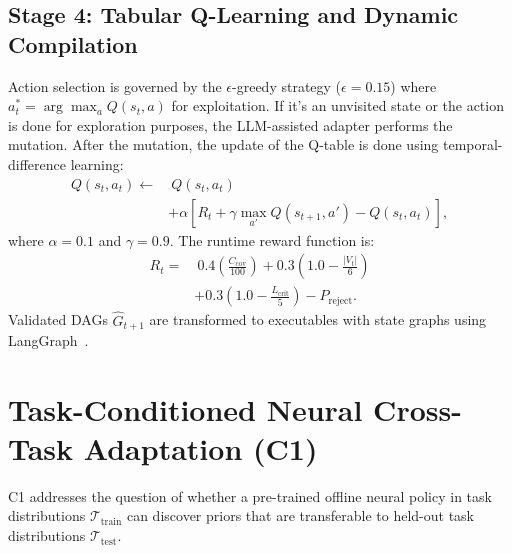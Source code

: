 ﻿\documentclass[conference]{IEEEtran}
\begin{document}
\subsection{Stage 4: Tabular Q-Learning and Dynamic Compilation}
Action selection is governed by the $\epsilon$-greedy strategy ($\epsilon=0.15$) where $a_t^* = \arg\max_a Q(s_t, a)$ for exploitation. If it's an unvisited state or the action is done for exploration purposes, the LLM-assisted adapter performs the mutation. After the mutation, the update of the Q-table is done using temporal-difference learning:
\begin{equation}
\begin{aligned}
Q(s_t, a_t) \leftarrow & \ Q(s_t, a_t) \\
& + \alpha \left[ R_t + \gamma \max_{a'} Q(s_{t+1}, a') - Q(s_t, a_t) \right],
\end{aligned}
\end{equation}
where $\alpha = 0.1$ and $\gamma = 0.9$. The runtime reward function is:
\begin{equation}
\begin{aligned}
R_t = & \ 0.4 \left(\frac{C_{\mathrm{cov}}}{100}\right) + 0.3 \left(1.0 - \frac{|V_t|}{6}\right) \\
& + 0.3 \left(1.0 - \frac{L_{\mathrm{crit}}}{5}\right) - P_{\mathrm{reject}}.
\end{aligned}
\label{eq:reward}
\end{equation}
Validated DAGs $\widehat{G}_{t+1}$ are transformed to executables with state graphs using LangGraph~\cite{langgraph2024}.



\section{Task-Conditioned Neural Cross-Task Adaptation (C1)}
\label{sec:neural_adaptation}

C1 addresses the question of whether a pre-trained offline neural policy in task distributions $\mathcal{T}_{\mathrm{train}}$ can discover priors that are transferable to held-out task distributions $\mathcal{T}_{\mathrm{test}}$.
\end{document}
